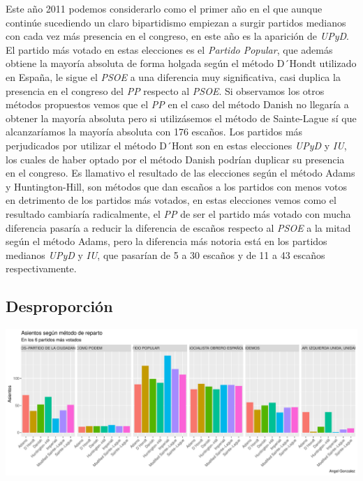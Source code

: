 \documentclass[12pt,a4paper,]{book}
\numberwithin{dummy}{section}
\theoremstyle{ocrenumbox}
\theoremstyle{blacknumex}
\theoremstyle{blacknumbox}
\theoremstyle{ocrenum}
\theoremstyle{ocrenum}
\begin{document}
Este año 2011 podemos considerarlo como el primer año en el que aunque
continúe sucediendo un claro bipartidismo empiezan a surgir partidos
medianos con cada vez más presencia en el congreso, en este año es la
aparición de \emph{UPyD}. El partido más votado en estas elecciones es
el \emph{Partido Popular}, que además obtiene la mayoría absoluta de
forma holgada según el método D´Hondt utilizado en España, le sigue el
\emph{PSOE} a una diferencia muy significativa, casi duplica la
presencia en el congreso del \emph{PP} respecto al \emph{PSOE}. Si
observamos los otros métodos propuestos vemos que el \emph{PP} en el
caso del método Danish no llegaría a obtener la mayoría absoluta pero si
utilizásemos el método de Sainte-Lague sí que alcanzaríamos la mayoría
absoluta con 176 escaños. Los partidos más perjudicados por utilizar el
método D´Hont son en estas elecciones \emph{UPyD} y \emph{IU}, los
cuales de haber optado por el método Danish podrían duplicar su
presencia en el congreso. Es llamativo el resultado de las elecciones
según el método Adams y Huntington-Hill, son métodos que dan escaños a
los partidos con menos votos en detrimento de los partidos más votados,
en estas elecciones vemos como el resultado cambiaría radicalmente, el
\emph{PP} de ser el partido más votado con mucha diferencia pasaría a
reducir la diferencia de escaños respecto al \emph{PSOE} a la mitad
según el método Adams, pero la diferencia más notoria está en los
partidos medianos \emph{UPyD} y \emph{IU}, que pasarían de 5 a 30
escaños y de 11 a 43 escaños respectivamente.

\hypertarget{desproporciuxf3n-10}{%
\subsection{Desproporción}\label{desproporciuxf3n-10}}

\begin{center}\includegraphics[width=1\linewidth]{figurasR/unnamed-chunk-109-1} \end{center}
\end{document}

